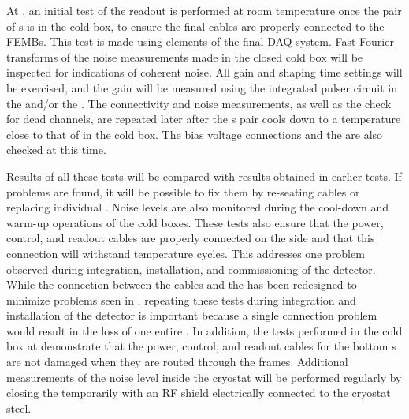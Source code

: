 At , an initial test of the readout is performed at room temperature
once the pair of s is in the cold box, to ensure the final cables are
properly connected to the FEMBs. This test is made using elements of the final DAQ system.
Fast Fourier transforms of
the noise measurements made in the closed cold box will be inspected for indications
of coherent noise. All  gain and shaping time settings will be exercised,
and the gain will be measured using the integrated pulser circuit in the 
 and/or the . The connectivity and noise measurements, as well
as the check for dead channels, are repeated later after the s pair cools
down to a temperature close to that of \lntwo in the cold box. The bias voltage
connections and the  are also checked at this time.

Results of all these tests will be compared with results obtained 
in earlier  tests.  If problems are found, it will be possible 
to fix them by re-seating cables or replacing individual .
Noise levels are also monitored during the cool-down and warm-up 
operations of the cold boxes. These tests also ensure that the power,
control, and readout cables are properly connected
on the  side and that this connection will withstand temperature 
cycles. This addresses one problem observed during integration,
installation, and commissioning of the  
detector. While the connection between the cables and the 
has been redesigned to minimize problems seen in ,
repeating these tests during integration
and installation of the detector is important because a single connection problem would
result in the loss of one entire . In addition, the tests 
performed in the cold box at  demonstrate that the power, control, and
readout cables for the bottom s are not damaged when they are routed 
through the  frames. Additional measurements of the noise
level inside the cryostat will be performed regularly by closing 
the  temporarily with an RF shield electrically connected 
to the cryostat steel. 

